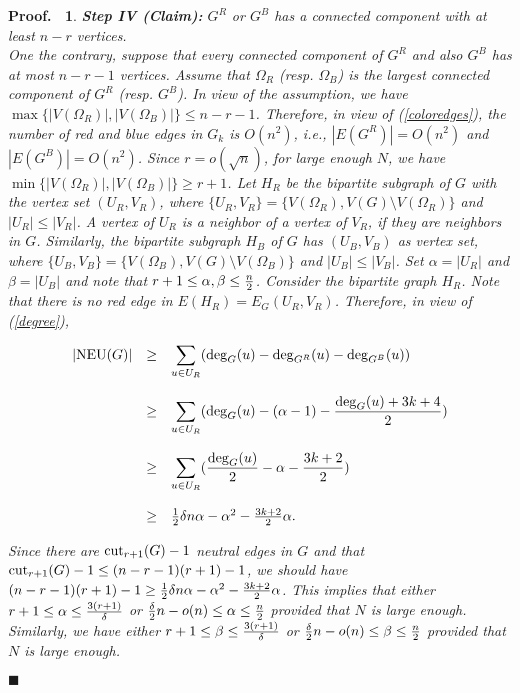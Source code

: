 \documentclass[11pt]{article}
\newtheorem{preproof}{{\bf Proof.\ }}
\newenvironment{proof}[1]{\begin{preproof}{\rm
               #1}\hfill{$\blacksquare$}}{\end{preproof}}
\begin{document}
\begin{proof}
{%
{\bf Step IV (Claim):} $G^R$ or $G^B$ has a connected component with at least $n-r$ vertices.\\
One the contrary, suppose that every connected component of $G^R$ and also $G^B$ has at most $n-r-1$ vertices. 
Assume that $\Omega_R$ (resp. $\Omega_B$) is the largest connected component of $G^R$ (resp. $G^B$). 
In view of the assumption, we have $\max\{|V(\Omega_R)|, |V(\Omega_B)|\}\leq n-r-1$. 
Therefore, in view of (\ref{coloredges}), 
the number of red and blue edges in $G_k$ is $O(n^2)$, i.e., $|E(G^R)|=O(n^2)$ and $|E(G^B)|=O(n^2)$. 
Since $r=o(\sqrt n)$, for large enough $N$, we have $\min\{|V(\Omega_R)|, |V(\Omega_B)|\}\geq r+1$. 
Let $H_R$ be the bipartite subgraph of $G$ with the vertex set $(U_R,V_R)$,
where $\{U_R, V_R\}=\{V(\Omega_R), V(G) \setminus V(\Omega_R)\}$ and
$|U_R|\leq|V_R|$. 
A vertex of $U_R$ is a neighbor of a vertex 
of $V_R$, if they are neighbors in $G$. Similarly, the bipartite subgraph 
$H_B$ of $G$ has $(U_B,V_B)$ as vertex set, where  $\{U_B, V_B\}=\{V(\Omega_B), V(G) \setminus V(\Omega_B)\}$ and
$|U_B|\leq|V_B|$. 
Set $\alpha=|U_R|$ and $\beta=|U_B|$ and note that $r+1\leq \alpha, \beta\leq {n\over 2}$. Consider the bipartite graph $H_R$. 
Note that there is no red edge in $E(H_R)=E_G(U_R,V_R)$. 
Therefore, in view of (\ref{degree}),    

$$
\begin{array}{rcl}
|{\rm NEU}(G)| & \geq &
\displaystyle\sum_{u\in U_R} ({\rm deg}_{G}(u)-{\rm deg}_{G^R}(u)-{\rm deg}_{G^B}(u))\\ 
& & \\
& \geq & \displaystyle\sum_{u\in U_R} ({\rm deg}_{G}(u)-(\alpha-1)-{{\rm deg}_{G}(u)+3k+4\over 2})\\ 
& & \\
& \geq &  \displaystyle\sum_{u\in U_R} ({{\rm deg}_{G}(u)\over 2}-\alpha-{3k+2\over 2})\\
& & \\
&\geq & {1\over 2} \delta n\alpha-\alpha^2-{3k+2\over 2}\alpha.
\end{array}
$$

Since there are ${\rm cut}_{r+1}(G)-1$ neutral edges in $G$ and that ${\rm cut}_{r+1}(G)-1\leq (n-r-1)(r+1)-1$, we should have  
$(n-r-1)(r+1)-1\geq {1\over 2} \delta n\alpha-\alpha^2-{3k+2\over 2}\alpha$. 
This implies that either $r+1\leq \alpha\leq {3(r+1)\over \delta}$ or ${\delta\over 2}n-o(n)\leq \alpha\leq {n\over 2}$ provided that $N$ is large enough. Similarly, we have either $r+1\leq \beta\leq {3(r+1)\over \delta}$ or ${\delta\over 2}n-o(n)\leq \beta\leq {n\over 2}$ provided that $N$ is large enough.\\ 

}
\end{proof}
\end{document}
